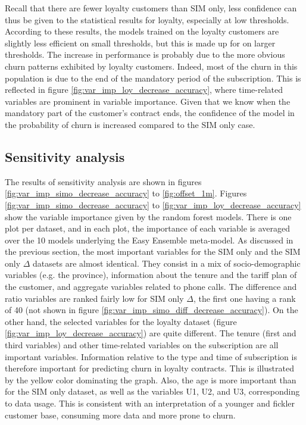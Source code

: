 Recall that there are fewer loyalty customers than SIM only, less confidence can
thus be given to the statistical results for loyalty, especially at low
thresholds. According to these results, the models trained on the loyalty
customers are slightly less efficient on small thresholds, but this is made up
for on larger thresholds. The increase in performance is probably due to the
more obvious churn patterns exhibited by loyalty customers. Indeed, most of the
churn in this population is due to the end of the mandatory period of the
subscription. This is reflected in figure
\ref{fig:var_imp_loy_decrease_accuracy}, where time-related variables are
prominent in variable importance. Given that we know when the mandatory part of
the customer's contract ends, the confidence of the model in the probability of
churn is increased compared to the SIM only case.

\subsection{Sensitivity analysis}

The results of sensitivity analysis are shown in figures
\ref{fig:var_imp_simo_decrease_accuracy} to \ref{fig:offset_1m}. Figures
\ref{fig:var_imp_simo_decrease_accuracy} to
\ref{fig:var_imp_loy_decrease_accuracy} show the variable importance given by
the random forest models. There is one plot per dataset, and in each plot, the
importance of each variable is averaged over the 10 models underlying the Easy
Ensemble meta-model. As discussed in the previous section, the most important
variables for the SIM only and the SIM only $\Delta$ datasets are almost
identical. They consist in a mix of socio-demographic variables (e.g. the
province), information about the tenure and the tariff plan of the customer, and
aggregate variables related to phone calls. The difference and ratio variables
are ranked fairly low for SIM only $\Delta$, the first one having a rank of 40
(not shown in figure \ref{fig:var_imp_simo_diff_decrease_accuracy}). On the
other hand, the selected variables for the loyalty dataset (figure
\ref{fig:var_imp_loy_decrease_accuracy}) are quite different. The tenure (first
and third variables) and other time-related variables on the subscription are
all important variables. Information relative to the type and time of
subscription is therefore important for predicting churn in loyalty contracts.
This is illustrated by the yellow color dominating the graph. Also, the age is
more important than for the SIM only dataset, as well as the variables U1, U2,
and U3, corresponding to data usage. This is consistent with an interpretation
of a younger and fickler customer base, consuming more data and more prone to
churn.

